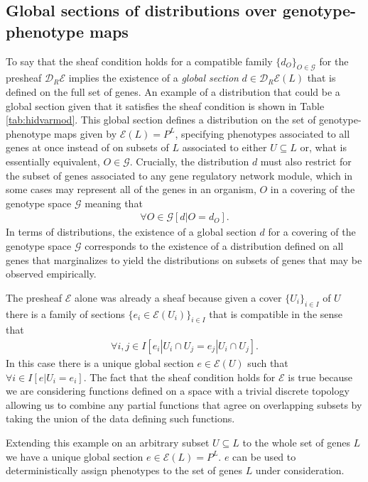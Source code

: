 \subsection*{Global sections of distributions over genotype-phenotype maps}
To say that the sheaf condition holds for a compatible family $\{d_O\}_{O \in \mathcal{G}}$ for the presheaf $\mathcal{D}_R\mathcal{E}$ implies the existence of a \emph{global section} $d \in \mathcal{D}_R\mathcal{E}(L)$ that is defined on the full set of genes. An example of a distribution that could be a global section given that it satisfies the sheaf condition is shown in Table \ref{tab:hidvarmod}. This global section defines a distribution on the set of genotype-phenotype maps given by $\mathcal{E}(L) = P^L$, specifying phenotypes associated to all genes at once instead of on subsets of $L$ associated to either $U \subseteq L$ or, what is essentially equivalent, $O \in \mathcal{G}$. Crucially, the distribution $d$ must also restrict for the subset of genes associated to any gene regulatory network module, which in some cases may represent all of the genes in an organism, $O$ in a covering of the genotype space $\mathcal{G}$ meaning that
\begin{eqnarray}
\forall O \in \mathcal{G} \left[ d|O = d_O \right].
\end{eqnarray}
In terms of distributions, the existence of a global section $d$ for a covering of the genotype space $\mathcal{G}$ corresponds to the existence of a distribution defined on all genes that marginalizes to yield the distributions on subsets of genes that may be observed empirically.

The presheaf $\mathcal{E}$ alone was already a sheaf because given a cover $\{U_i\}_{i \in I}$ of $U$ there is a family of sections $\{e_i \in \mathcal{E}(U_i)\}_{i \in I}$ that is compatible in the sense that
\begin{eqnarray}
\forall i,j \in I \left[ e_i|U_i \cap U_j = e_j|U_i \cap U_j \right].
\end{eqnarray}
In this case there is a unique global section $e \in \mathcal{E}(U)$ such that $\forall i \in I \left[ e|U_i = e_i \right]$. The fact that the sheaf condition holds for $\mathcal{E}$ is true because we are considering functions defined on a space with a trivial discrete topology allowing us to combine any partial functions that agree on overlapping subsets by taking the union of the data defining such functions.

Extending this example on an arbitrary subset $U \subseteq L$ to the whole set of genes $L$ we have a unique global section $e \in \mathcal{E}(L) = P^L$. $e$ can be used to deterministically assign phenotypes to the set of genes $L$ under consideration.

